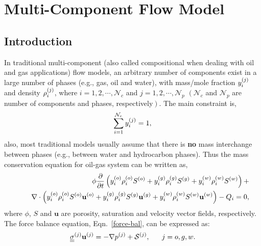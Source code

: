 
\chapter{Multi-Component Flow Model}\label{Chapter:CompositionalModel}


\section{Introduction}\label{Chapter:CompositionalModel:Section:Introduction}
In traditional multi-component (also called compositional when dealing with oil and gas applications) flow models, an arbitrary number of components exist in a large number of phases (e.g., gas, oil and water), with mass/mole fraction $\mfr[y]{i}{j}$ and density $\mfr[\rho]{i}{j}$, where $i = 1, 2, \cdots, \mathcal{N}_{c}$ and $j=1, 2, \cdots, \mathcal{N}_{p}$ $\left(\mathcal{N}_{c}\right.$ and $\mathcal{N}_{p}$ are number of components and phases, respectively$\left.\right)$. The main constraint is,
   \begin{displaymath}
      \summation_{i=1}^{\mathcal{N}_{c}} \mfr[y]{i}{j} = 1,
   \end{displaymath}
also, most traditional models usually assume that there is {\bf no} mass interchange between phases (e.g., between water and hydrocarbon phases). Thus the mass conservation equation for oil-gas system can be written as,
   \begin{eqnarray}
      &&\phi \frc{\partial}{\partial t}\left( \mfr[y]{i}{o} \mfr[\rho]{i}{o} \mfr[S]{}{o} + \mfr[y]{i}{g} \mfr[\rho]{i}{g} \mfr[S]{}{g} +  \mfr[y]{i}{w} \mfr[\rho]{i}{w} \mfr[S]{}{w}\right) + \nonumber \\
        &&\;\;\;\; \nabla \cdot \left(\mfr[y]{i}{o} \mfr[\rho]{i}{o}\mfr[S]{}{o}  \mfr[\mathbf{u}]{}{o} + \mfr[y]{i}{g}\mfr[\rho]{i}{g}\mfr[S]{}{g} \mfr[\mathbf{u}]{}{g} + \mfr[y]{i}{w} \mfr[\rho]{i}{w}\mfr[S]{}{w} \mfr[\mathbf{u}]{}{w} \right) - Q_i = 0, \label{Chapter:CompositionalModel:Eqn:saturation_comp_old}
   \end{eqnarray}
where $\phi$, $S$ and $\mathbf{u}$ are porosity, saturation and velocity vector fields, respectively. The force balance equation, Eqn.~\ref{force-bal}, can be expressed as:
   \begin{equation}
       \mfr[\underline{\underline{\sigma}}]{}{j} \mfr[\mathbf u]{}{j} = - \nabla \mfr[p]{}{j} + \mfr[\mathcal{S}]{}{j}, ~~~~~ j = o,g,w .\label{Chapter:CompositionalModel:Eqn:ForceBalance}
   \end{equation}
